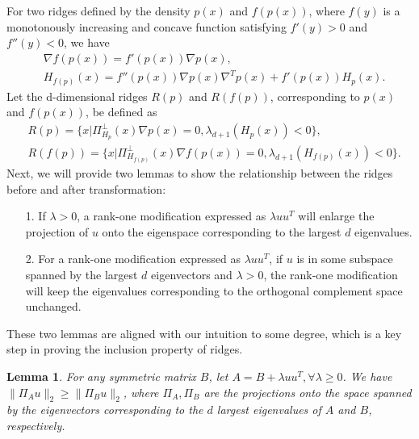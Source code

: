 \documentclass[aos,preprint]{imsart}
\newtheorem{lemma}[theorem]{Lemma}
\theoremstyle{remark}
\begin{document}
For two ridges defined by the density $p(x)$ and $f(p(x))$, where $f(y)$ is a monotonously increasing and concave function satisfying $f'(y)>0$ and $f''(y)<0$, we have 
\begin{equation}\label{derivatef}
\begin{aligned}
&\nabla f(p(x)) = f'(p(x)) \nabla p(x),\\
&H_{f(p)}(x) = f''(p(x)) \nabla p(x) \nabla^T p(x) + f'(p(x)) H_{p}(x).
\end{aligned}
\end{equation}
Let the d-dimensional ridges $R(p)$ and $R(f(p))$, corresponding to $p(x)$ and $f(p(x))$, be defined as
\[
\begin{aligned}
&R({p}) = \{x | \Pi_{H_{p}}^{\perp} (x) \nabla p(x) = 0, \lambda_{d+1}(H_{p}(x))<0\}, \\
&R({f(p)}) = \{x | \Pi_{H_{f(p)}}^{\perp} (x) \nabla f(p(x)) = 0,\lambda_{d+1}(H_{f(p)}(x))<0\}.
\end{aligned}
\]
Next, we will provide two lemmas to show the relationship between the ridges before and after transformation:
\begin{itemize}
\item[1.]  If $\lambda>0$, a rank-one modification expressed as $\lambda uu^T$ will enlarge the projection of $u$ onto the eigenspace corresponding to the largest $d$ eigenvalues. 
\item[2.] For a rank-one modification expressed as $\lambda uu^T$, if $u$ is in some subspace spanned by the largest $d$ eigenvectors and $\lambda>0$, the rank-one modification will keep the eigenvalues corresponding to the orthogonal complement space unchanged.
\end{itemize}
These two lemmas are aligned with our intuition to some degree, which is a key step in proving the inclusion property of ridges.

\begin{lemma}{ For any symmetric matrix $B$, let $A = B +\lambda uu^T, \forall \lambda\geq 0$. We have $\|\Pi_A u\|_2\geq \|\Pi_B u\|_2$, where $\Pi_A, \Pi_B$ are the projections onto the space spanned by the eigenvectors corresponding to the $d$ largest eigenvalues of $A$ and $B$, respectively.} \label{projection_enlarge}
\end{lemma}
\end{document}
